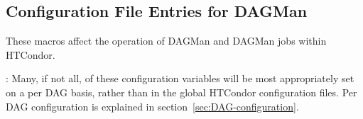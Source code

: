 \subsection{\label{sec:DAGMan-Config-File-Entries}Configuration File 
Entries for DAGMan}

These macros affect the operation of DAGMan and DAGMan
jobs within HTCondor.

: Many, if not all, of these configuration variables will
be most appropriately set on a per DAG basis, rather than in the
global HTCondor configuration files.  Per DAG configuration is explained
in section~\ref{sec:DAG-configuration}.

